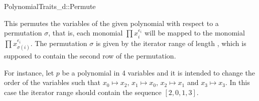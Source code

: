 \begin{ccRefConcept}{PolynomialTraits_d::Permute}

\ccDefinition

This  permutes the variables of the given polynomial
with respect to a permutation $\sigma$, that is, each monomial 
$\prod x_i^{e_i}$ will be mapped to the monomial $\prod x_{\sigma(i)}^{e_i}$. 
The permutation $\sigma$ is given by the iterator range of 
length , which is supposed to contain 
the second row of the permutation. 

For instance, let $p$ be a polynomial in 4 variables and it is intended to 
change the order of the variables such that 
$x_0 \mapsto x_2$, $x_1 \mapsto x_0$, $x_2 \mapsto x_1$ and $x_3 \mapsto x_3$. 
In this case the iterator range should contain the sequence $[2,0,1,3]$. 


\ccRefines 


\ccTypes

\ccGlue

\ccOperations


\ccOperations
{}






\ccSeeAlso

\\
\\

\end{ccRefConcept}